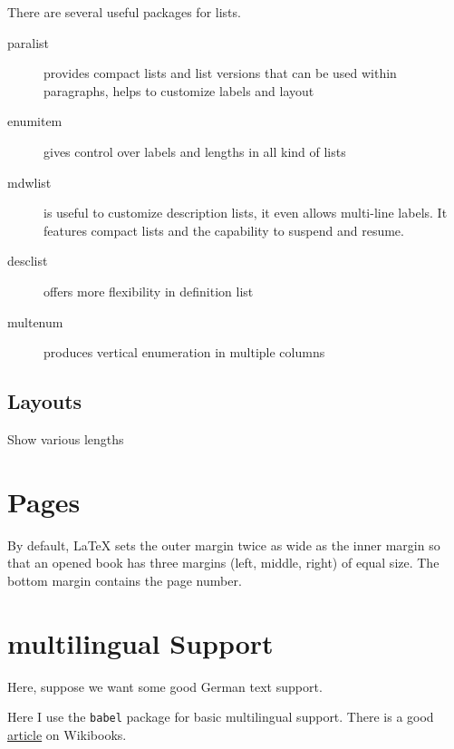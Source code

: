 \documentclass[a4paper,12pt]{article}
\newcommand{\code}[1]{\texttt{#1}}
\begin{document}
There are several useful packages for lists.

\begin{description}
  \item[paralist] provides compact lists and list versions that
can be used within paragraphs, helps to customize labels and
layout
\item[enumitem] gives control over labels and lengths
in all kind of lists
\item[mdwlist] is useful to customize description lists, it
even allows multi-line labels. It features compact lists and
the capability to suspend and resume.
\item[desclist] offers more flexibility in definition list
\item[multenum] produces vertical enumeration in multiple
columns
\end{description}

\subsection{Layouts}

Show various lengths

\listdiagram

\section{Pages}

By default, LaTeX sets the outer margin twice as wide as the inner margin so that an opened book has three margins (left, middle, right) of equal size. The bottom margin contains the page number.

\section{multilingual Support}

Here, suppose we want some good German text support.

Here I use the \code{babel} package for basic multilingual support. There is a good \href{https://en.wikibooks.org/wiki/LaTeX/Internationalization}{article}
on Wikibooks.
\end{document}

